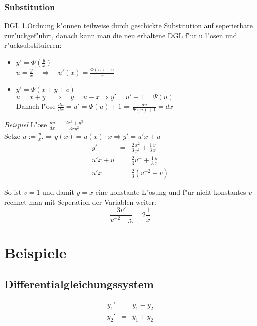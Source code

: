 \documentclass[german, 10pt, a4paper, twocolumn]{scrartcl}
\theoremstyle{definition}
\begin{document}
\subsubsection{Substitution}

DGL 1.Ordnung k"onnen teilweise durch geschickte Substitution auf seperierbare zur"uckgef"uhrt, danach kann man die neu erhaltene DGL f"ur u l"osen und r"ucksubstituieren:

\begin{itemize}
 \item $y'=\Phi(\frac{y}{x})$\\
  $u=\frac{y}{x}\quad\Rightarrow\quad u'(x)=\frac{\Phi(u)-u}{x}$
 \item $y'=\Psi(x+y+c)$\\
  $u=x+y\quad\Rightarrow\quad y=u-x\Rightarrow y'=u'-1=\Psi(u)$\\
  Danach l"ose $\frac{du}{dx}=u'=\Psi(u)+1\Rightarrow \frac{du}{\Psi(u)+1}=dx$
\end{itemize}

\textit{Beispiel} L"ose $\frac{dy}{dx}=\frac{2x^3+y^3}{3xy^2}$\\
Setze $u:=\frac{y}{x}.\Rightarrow y(x)=u(x)\cdotp x\Rightarrow y'=u'x+u$
\begin{eqnarray}
 y'&	=&	\frac{2}{3}\frac{x^2}{y^2}+\frac{1}{3}\frac{y}{x}\nonumber\\
 u'x+u&	=&	\frac{2}{3}v^{-}+\frac{1}{3}\frac{y}{x}\nonumber\\
 u'x&	=&	\frac{2}{3}(v^{-2}-v)\nonumber
\end{eqnarray}

So ist $v=1$ und damit $y=x$ eine konstante L"osung und f"ur nicht konstantes $v$ rechnet man mit Seperation der Variablen weiter:
$$\frac{3v'}{v^{-2}-v}=2\frac{1}{x}$$
$$...$$



\section{Beispiele}

\subsection{Differentialgleichungssystem}

\begin{eqnarray*}
	y_1' &	= &	y_1 - y_2 \\
	y_2' &	= &	y_1 + y_2 \\
\end{eqnarray*}
\end{document}
